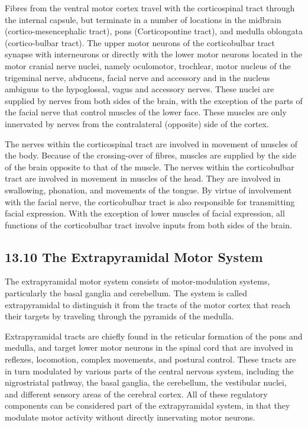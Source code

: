Fibres from the ventral motor cortex travel with the corticospinal tract
through the internal capsule, but terminate in a number of locations in
the midbrain (cortico-mesencephalic tract), pons (Corticopontine tract),
and medulla oblongata (cortico-bulbar tract). The upper motor neurons of
the corticobulbar tract synapse with interneurons or directly with the
lower motor neurons located in the motor cranial nerve nuclei, namely
oculomotor, trochlear, motor nucleus of the trigeminal nerve, abducens,
facial nerve and accessory and in the nucleus ambiguus to the
hypoglossal, vagus and accessory nerves. These nuclei are supplied by
nerves from both sides of the brain, with the exception of the parts of
the facial nerve that control muscles of the lower face. These muscles
are only innervated by nerves from the contralateral (opposite) side of
the cortex.

The nerves within the corticospinal tract are involved in movement of
muscles of the body. Because of the crossing-over of fibres, muscles are
supplied by the side of the brain opposite to that of the muscle. The
nerves within the corticobulbar tract are involved in movement in
muscles of the head. They are involved in swallowing, phonation, and
movements of the tongue. By virtue of involvement with the facial nerve,
the corticobulbar tract is also responsible for transmitting facial
expression. With the exception of lower muscles of facial expression,
all functions of the corticobulbar tract involve inputs from both sides
of the brain.

\hypertarget{the-extrapyramidal-motor-system}{%
\subsection{\texorpdfstring{{13.10} The Extrapyramidal Motor
System}{13.10 The Extrapyramidal Motor System}}\label{the-extrapyramidal-motor-system}}

The extrapyramidal motor system consists of motor-modulation systems,
particularly the basal ganglia and cerebellum. The system is called
extrapyramidal to distinguish it from the tracts of the motor cortex
that reach their targets by traveling through the pyramids of the
medulla.

Extrapyramidal tracts are chiefly found in the reticular formation of
the pons and medulla, and target lower motor neurons in the spinal cord
that are involved in reflexes, locomotion, complex movements, and
postural control. These tracts are in turn modulated by various parts of
the central nervous system, including the nigrostriatal pathway, the
basal ganglia, the cerebellum, the vestibular nuclei, and different
sensory areas of the cerebral cortex. All of these regulatory components
can be considered part of the extrapyramidal system, in that they
modulate motor activity without directly innervating motor neurons.

